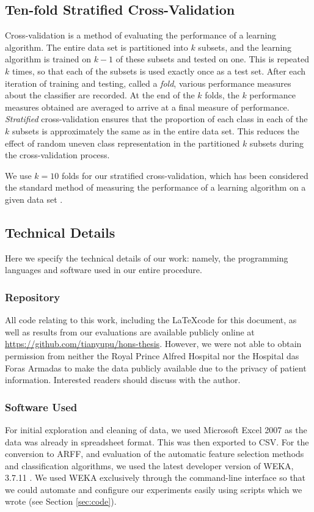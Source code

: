 \subsection{Ten-fold Stratified Cross-Validation}
Cross-validation is a method of evaluating the performance of a learning
algorithm. The entire data set is partitioned into $k$ subsets, and the
learning algorithm is trained on $k-1$ of these subsets and tested on one. This
is repeated $k$ times, so that each of the subsets is used exactly once as a
test set. After each iteration of training and testing, called a \textit{fold},
various performance measures about the classifier are recorded. At the end of
the $k$ folds, the $k$ performance measures obtained are averaged to arrive at
a final measure of performance. \textit{Stratified} cross-validation ensures
that the proportion of each class in each of the $k$ subsets is approximately
the same as in the entire data set. This reduces the effect of random uneven
class representation in the partitioned $k$ subsets during the cross-validation
process.

We use $k=10$ folds for our stratified cross-validation, which has been
considered the standard method of measuring the performance of a learning
algorithm on a given data set \cite{Witten2005}.

\subsection{Technical Details}
Here we specify the technical details of our work: namely, the programming
languages and software used in our entire procedure.

\subsubsection{Repository}
All code relating to this work, including the \LaTeX code for this document,
as well as results from our evaluations are available publicly online at
\url{https://github.com/tianyupu/hons-thesis}. However, we were not able to
obtain permission from neither the Royal Prince Alfred Hospital nor the
Hospital das Foras Armadas to make the data publicly available due to the
privacy of patient information. Interested readers should discuss with the
author.

\subsubsection{Software Used}
For initial exploration and cleaning of data, we used Microsoft Excel 2007
as the data was already in spreadsheet format. This was then exported to
CSV. For the conversion to ARFF, and evaluation of the automatic
feature selection methods and classification algorithms, we used the latest
developer version of WEKA, 3.7.11 \cite{Hall2009}. We used WEKA exclusively
through the command-line interface so that we could automate and configure
our experiments easily using scripts which we wrote (see Section
\ref{sec:code}).

